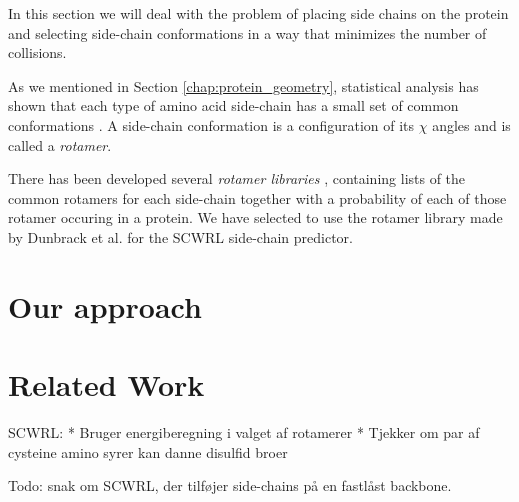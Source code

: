 In this section we will deal with the problem of placing side chains
on the protein and selecting side-chain conformations in a way that
minimizes the number of collisions.

As we mentioned in Section \ref{chap:protein_geometry}, statistical
analysis has shown that each type of amino acid side-chain has a small
set of common conformations \cite{dunbrack2002rotamer}. A side-chain
conformation is a configuration of its $\chi$ angles and is called a
\textit{rotamer}.

There has been developed several \textit{rotamer libraries}
\cite{dunbrack2002rotamer, lovell2000penultimate}, containing lists of
the common rotamers for each side-chain together with a probability of
each of those rotamer occuring in a protein. We have selected to use
the rotamer library made by Dunbrack et al. for the SCWRL side-chain
predictor.

\section{Our approach}

\section{Related Work}
SCWRL: 
 * Bruger energiberegning i valget af rotamerer
 * Tjekker om par af cysteine amino syrer kan danne disulfid broer


Todo: snak om SCWRL, der tilføjer side-chains på en fastlåst backbone.


